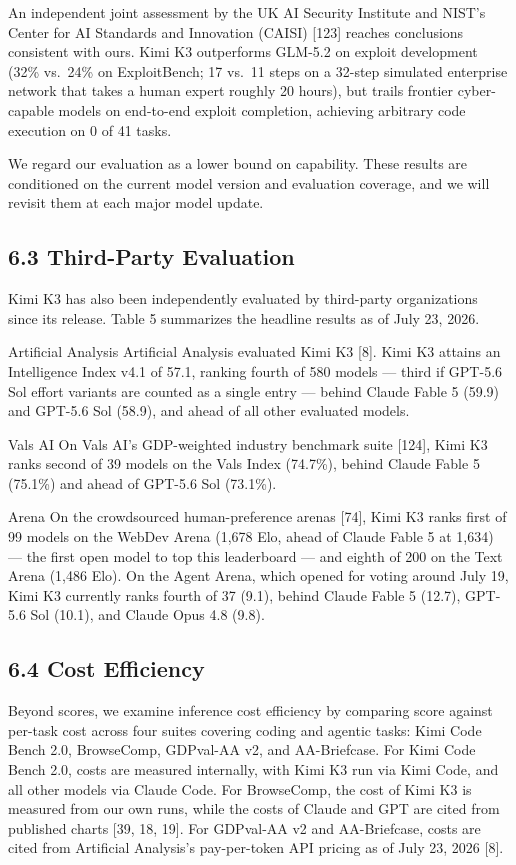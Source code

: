 \documentclass[
  10
]{article}
\begin{document}
An independent joint assessment by the UK AI Security Institute and
NIST's Center for AI Standards and Innovation (CAISI) {[}123{]} reaches
conclusions consistent with ours. Kimi K3 outperforms GLM-5.2 on exploit
development (32\% vs.~24\% on ExploitBench; 17 vs.~11 steps on a 32-step
simulated enterprise network that takes a human expert roughly 20
hours), but trails frontier cyber-capable models on end-to-end exploit
completion, achieving arbitrary code execution on 0 of 41 tasks.

We regard our evaluation as a lower bound on capability. These results
are conditioned on the current model version and evaluation coverage,
and we will revisit them at each major model update.

\subsection{6.3 Third-Party Evaluation}\label{third-party-evaluation}

Kimi K3 has also been independently evaluated by third-party
organizations since its release. Table 5 summarizes the headline results
as of July 23, 2026.

Artificial Analysis Artificial Analysis evaluated Kimi K3 {[}8{]}. Kimi
K3 attains an Intelligence Index v4.1 of 57.1, ranking fourth of 580
models --- third if GPT-5.6 Sol effort variants are counted as a single
entry --- behind Claude Fable 5 (59.9) and GPT-5.6 Sol (58.9), and ahead
of all other evaluated models.

Vals AI On Vals AI's GDP-weighted industry benchmark suite {[}124{]},
Kimi K3 ranks second of 39 models on the Vals Index (74.7\%), behind
Claude Fable 5 (75.1\%) and ahead of GPT-5.6 Sol (73.1\%).

Arena On the crowdsourced human-preference arenas {[}74{]}, Kimi K3
ranks first of 99 models on the WebDev Arena (1,678 Elo, ahead of Claude
Fable 5 at 1,634) --- the first open model to top this leaderboard ---
and eighth of 200 on the Text Arena (1,486 Elo). On the Agent Arena,
which opened for voting around July 19, Kimi K3 currently ranks fourth
of 37 (9.1), behind Claude Fable 5 (12.7), GPT-5.6 Sol (10.1), and
Claude Opus 4.8 (9.8).

\subsection{6.4 Cost Efficiency}\label{cost-efficiency}

Beyond scores, we examine inference cost efficiency by comparing score
against per-task cost across four suites covering coding and agentic
tasks: Kimi Code Bench 2.0, BrowseComp, GDPval-AA v2, and AA-Briefcase.
For Kimi Code Bench 2.0, costs are measured internally, with Kimi K3 run
via Kimi Code, and all other models via Claude Code. For BrowseComp, the
cost of Kimi K3 is measured from our own runs, while the costs of Claude
and GPT are cited from published charts {[}39, 18, 19{]}. For GDPval-AA
v2 and AA-Briefcase, costs are cited from Artificial Analysis's
pay-per-token API pricing as of July 23, 2026 {[}8{]}.
\end{document}
